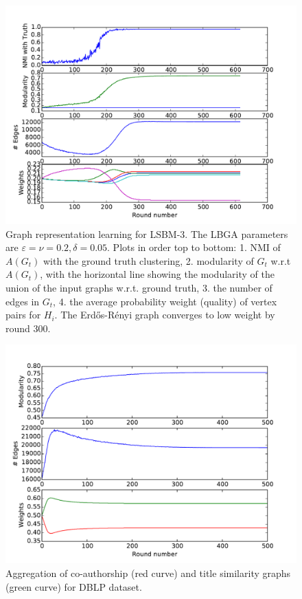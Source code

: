 \documentclass{article}
\newcommand{\er}{Erd\H{o}s-R\'{e}nyi }
\begin{document}
\begin{figure}[t]
\begin{centering}
\includegraphics[width=\columnwidth]{figures/LBM-SNR=6+ER-consistentNO+NEF.pdf}
\par\end{centering}
\caption{Graph representation learning for LSBM-3. The LBGA parameters are
$\varepsilon=\nu=0.2, \delta=0.05$. Plots in order top to bottom: 1. NMI of
$A(G_t)$ with the ground truth clustering, 2. modularity of $G_t$ w.r.t
$A(G_t)$, with the horizontal line showing the modularity of the union of the
input graphs w.r.t. ground truth, 3. the number of edges in $G_t$, 4.  the
average probability weight (quality) of vertex pairs for $H_i$.  The \er graph
converges to low weight by round 300.} 
\label{fig:local-sbm} 
\end{figure}

\begin{figure}[t]
\begin{centering}
\includegraphics[width=\columnwidth]{figures/DBLP-consistentNO+NEF.pdf}
\par\end{centering}
\caption{Aggregation of co-authorship (red curve) and title similarity graphs
(green curve) for DBLP dataset.} 
\label{fig:dblp}
\end{figure}
\end{document}
